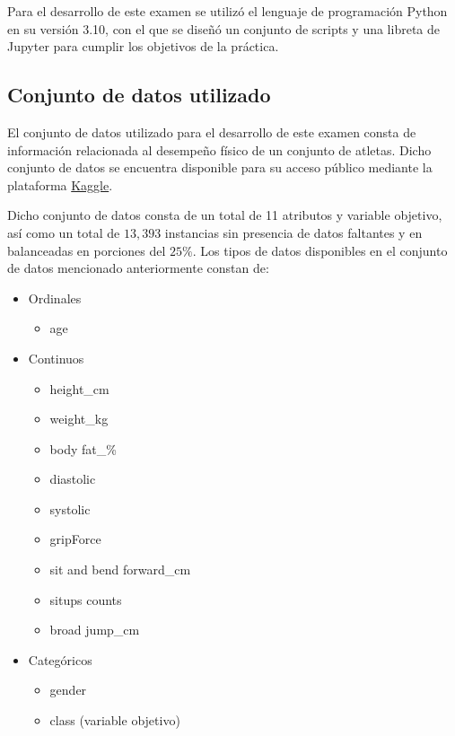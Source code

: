 Para el desarrollo de este examen se utilizó el lenguaje de programación Python en su versión 3.10, con el que se diseñó un conjunto de scripts y una libreta de Jupyter para cumplir los objetivos de la práctica.

\subsection{Conjunto de datos utilizado}
El conjunto de datos utilizado para el desarrollo de este examen consta de información relacionada al desempeño físico de un conjunto de atletas. Dicho conjunto de datos se encuentra disponible para su acceso público mediante la plataforma \href{https://www.kaggle.com/datasets/kukuroo3/body-performance-data}{Kaggle}.

Dicho conjunto de datos consta de un total de 11 atributos y variable objetivo, así como un total de $13,393$ instancias sin presencia de datos faltantes y en balanceadas en porciones del $25\%$. Los tipos de datos disponibles en el conjunto de datos mencionado anteriormente constan de:

\begin{itemize}
	\item Ordinales
	\begin{itemize}
		\item age
	\end{itemize}
	
	\item Continuos
	\begin{itemize}
		\item height\_cm
		\item weight\_kg
		\item body fat\_\%
		\item diastolic
		\item systolic
		\item gripForce
		\item sit and bend forward\_cm
		\item sit\-ups counts
		\item broad jump\_cm
	\end{itemize}
	
	\item Categóricos
	\begin{itemize}
		\item gender
		\item class (variable objetivo)
	\end{itemize}
\end{itemize}

